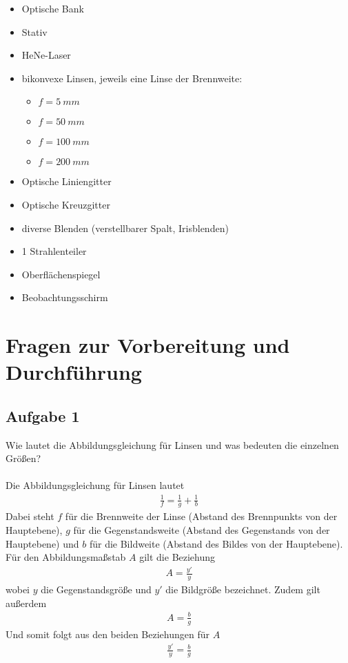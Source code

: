 \documentclass[a4paper,10pt]{scrartcl}
\begin{document}
  	\begin{itemize}  
  		\item Optische Bank
  		\item Stativ
  		\item HeNe-Laser
  		\item bikonvexe Linsen, jeweils eine Linse der Brennweite:
  			\begin{itemize}
  				\item $f = \SI{5}{mm}$
  				\item $f = \SI{50}{mm}$
  				\item $f = \SI{100}{mm}$
  				\item $f = \SI{200}{mm}$
  			\end{itemize}
  		\item Optische Liniengitter
  		\item Optische Kreuzgitter
  		\item diverse Blenden (verstellbarer Spalt, Irisblenden)
  		\item 1 Strahlenteiler
  		\item Oberflächenspiegel
  		\item Beobachtungsschirm
  	\end{itemize}
	
	\section{Fragen zur Vorbereitung und Durchführung}
		
		\subsection{Aufgabe 1}
			Wie lautet die Abbildungsgleichung für Linsen und was bedeuten die einzelnen Größen?\\
			\\
			Die Abbildungsgleichung für Linsen lautet 
			\begin{align*}
			\frac{1}{f}=\frac{1}{g}+\frac{1}{b}
			\end{align*}
			Dabei steht \(f\) für die Brennweite der Linse (Abstand des Brennpunkts von der Hauptebene), \(g\) für die Gegenstandsweite (Abstand des Gegenstands von der Hauptebene) und \(b\) für die Bildweite (Abstand des Bildes von der Hauptebene).\\
			Für den Abbildungsmaßstab \(A\) gilt die Beziehung
			\begin{align*}
			A=\frac{y'}{y}
			\end{align*}
			wobei \(y\) die Gegenstandsgröße und \(y'\) die Bildgröße bezeichnet. Zudem gilt außerdem
			\begin{align*}
			A=\frac{b}{g}
			\end{align*}
			Und somit folgt aus den beiden Beziehungen für \(A\)
			\begin{align*}
			\frac{y'}{y}=\frac{b}{g}
			\end{align*}
			
\end{document}
